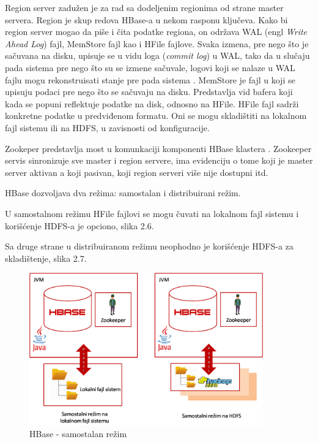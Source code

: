 \documentclass[12pt,oneside]{memoir}
\begin{document}
Region server zadužen je za rad sa dodeljenim regionima od strane master servera. Region je skup redova HBase-a u nekom rasponu ključeva. Kako bi region server mogao da piše i čita podatke regiona, on održava WAL (engl \textit{Write Ahead Log}) fajl, MemStore fajl kao i HFile fajlove. Svaka izmena, pre nego što je sačuvana na disku, upisuje se u vidu loga (\textit{commit log}) u WAL, tako da u slučaju pada sistema pre nego što su se izmene sačuvale, logovi koji se nalaze u WAL fajlu mogu rekonstruisati stanje pre pada sistema \cite{wal}. MemStore je fajl u koji se upisuju podaci pre nego što se sačuvaju na disku. Predstavlja vid bafera koji kada se popuni reflektuje podatke na disk, odnosno na HFile. HFile fajl sadrži konkretne podatke u predviđenom formatu. Oni se mogu skladištiti na lokalnom fajl sistemu ili na HDFS, u zavisnosti od konfiguracije.

Zookeper predstavlja most u komunkaciji komponenti HBase klastera \cite{zookeeper}. Zookeeper servis  sinronizuje sve master i region servere, ima evidenciju o tome koji je master server aktivan a koji pasivan, koji region serveri više nije dostupni itd.

HBase dozvoljava dva režima: samostalan i distribuirani režim.

U samostalnom režimu HFile fajlovi se mogu čuvati na lokalnom fajl sistemu i korišćenje HDFS-a je opciono, slika 2.6.

Sa druge strane u distribuiranom režimu neophodno je korišćenje HDFS-a za skladištenje, slika 2.7. 

\begin{figure}[!ht]
  \centering
  \includegraphics[width=0.9\textwidth]{hbase-standalone.png}
  \caption{HBase - samostalan režim}
  \label{fig:grafikon}
\end{figure}
\end{document}
